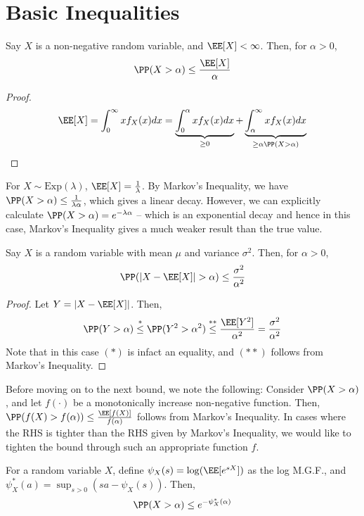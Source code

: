 \section{Basic Inequalities}
\begin{theorem}
Say $X$ is a non-negative random variable, and $\EE[X] < \infty$. Then, for $\alpha > 0$,
\begin{equation}
    \PP(X > \alpha) \leq \frac{\EE[X]}{\alpha}
\end{equation}
\end{theorem}
\begin{proof}
\[
\EE[X] = \int_0^\infty x f_X(x) dx = \underbrace{\int_0^\alpha xf_X(x)dx}_{\geq 0} + \underbrace{\int_\alpha^\infty x f_X(x) dx}_{\geq \alpha \PP(X>\alpha)}
\]
\end{proof}
\begin{eg}
For $X \sim \text{Exp}(\lambda)$, $\EE[X] = \frac{1}{\lambda}$. By Markov's Inequality, we have $\PP(X > \alpha) \leq \frac{1}{\lambda \alpha}$, which gives a linear decay. However, we can explicitly calculate $\PP(X > \alpha) = e^{-\lambda \alpha}$ -- which is an exponential decay and hence in this case, Markov's Inequality gives a much weaker result than the true value.
\end{eg}
\begin{theorem}
   Say $X$ is a random variable with mean $\mu$ and variance $\sigma^2$. Then, for $\alpha > 0$,
   \begin{equation}
       \PP(|X - \EE[X]| > \alpha) \leq \frac{\sigma^2}{\alpha^2}
   \end{equation}
\end{theorem}
\begin{proof}
Let $Y = |X - \EE[X]|$. Then,
\[
\PP(Y > \alpha) \stackrel{*}{\leq} \PP(Y^2 > \alpha^2) \stackrel{**}{\leq}\frac{\EE[Y^2]}{\alpha^2} = \frac{\sigma^2}{\alpha^2}
\]
Note that in this case $(*)$ is infact an equality, and $(**)$ follows from Markov's Inequality.
\end{proof}
Before moving on to the next bound, we note the following: Consider $\PP(X > \alpha)$, and let $f(\cdot)$ be a monotonically increase non-negative function. Then, $\PP(f(X) > f(\alpha)) \leq \frac{\EE[f(X)]}{f(\alpha)}$ follows from Markov's Inequality. In cases where the RHS is tighter than the RHS given by Markov's Inequality, we would like to tighten the bound through such an appropriate function $f$.
\begin{theorem}
For a random variable $X$, define $\psi_X(s) = \log(\EE[e^{sX}])$ as the log M.G.F., and $\psi_X^*(a) = \sup_{s > 0} (sa - \psi_X(s))$. Then,
\begin{equation}
    \PP(X > \alpha) \leq e^{-\psi_X^*(\alpha)}
\end{equation}
\end{theorem}
